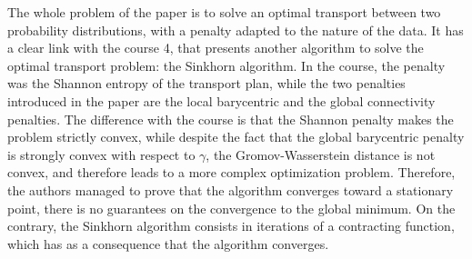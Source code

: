 \documentclass[a4paper,11pt]{article}
\begin{document}
The whole problem of the paper is to solve an optimal transport between two probability distributions, with a penalty adapted to the nature of the data. 
It has a clear link with the course 4, that presents another algorithm to solve the optimal transport problem: the Sinkhorn algorithm.
In the course, the penalty was the Shannon entropy of the transport plan, while the two penalties introduced in the paper are the local barycentric and the global connectivity penalties.
The difference with the course is that the Shannon penalty makes the problem strictly convex, while despite the fact that the global barycentric penalty is strongly convex with respect to $\gamma$, the Gromov-Wasserstein distance is not convex, and therefore leads to a more complex optimization problem.
Therefore, the authors managed to prove that the algorithm converges toward a stationary point, there is no guarantees on the convergence to the global minimum.
On the contrary, the Sinkhorn algorithm consists in iterations of a contracting function, which has as a consequence that the algorithm converges. 




\newpage
\printbibliography
\end{document}
